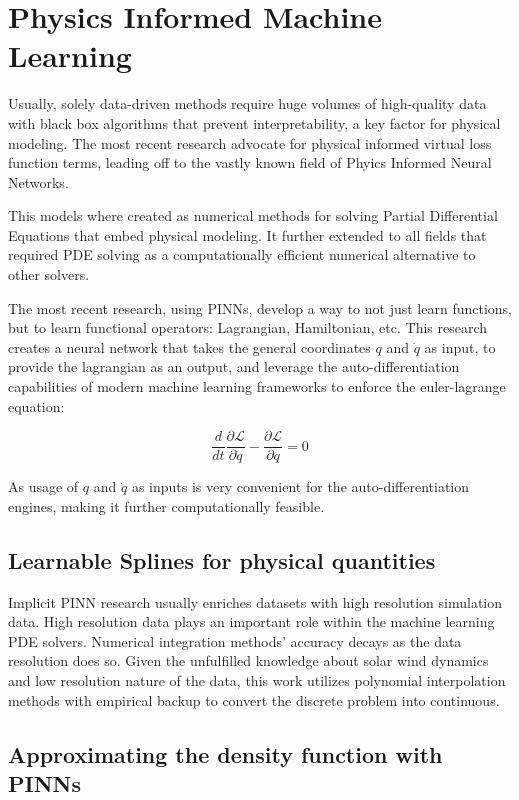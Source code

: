 \documentclass[12pt]{article}
\begin{document}
\section{Physics Informed Machine Learning}
Usually, solely data-driven methods require huge volumes of high-quality data with black box algorithms that prevent interpretability, a key factor for physical modeling. The most recent research \cite{PINNS} advocate for physical informed virtual loss function terms, leading off to the vastly known field of Phyics Informed Neural Networks.

This models where created as numerical methods for solving Partial Differential Equations that embed physical modeling. It further extended to all fields that required PDE solving as a computationally efficient numerical alternative to other solvers.

The most recent research, using PINNs, develop a way to not just learn functions, but to learn functional operators: Lagrangian, Hamiltonian, etc. This research \cite{} creates a neural network that takes the general coordinates $q$ and $\dot q$ as input, to provide the lagrangian as an output, and leverage the auto-differentiation capabilities of modern machine learning frameworks to enforce the euler-lagrange equation:

\begin{equation}
    \frac{d}{dt} \frac{\partial \mathcal{L}}{\partial \dot q} - \frac{\partial \mathcal{L}}{\partial q} = 0
\end{equation}

As usage of $q$ and $\dot q$ as inputs is very convenient for the auto-differentiation engines, making it further computationally feasible.

\subsection{Learnable Splines for physical quantities}

Implicit PINN research usually enriches datasets with high resolution simulation data. High resolution data plays an important role within the machine learning PDE solvers. Numerical integration methods' accuracy decays as the data resolution does so.
Given the unfulfilled knowledge about solar wind dynamics and low resolution nature of the data, this work utilizes polynomial interpolation methods with empirical backup \cite{windmodelling1} to convert the discrete problem into continuous.

\subsection{Approximating the density function with PINNs}
\end{document}
